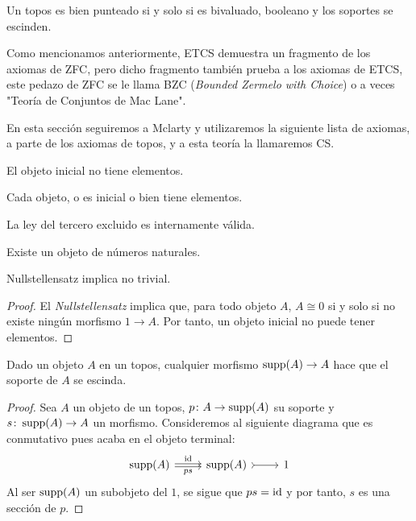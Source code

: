 \begin{theorem}
    Un topos es bien punteado si y solo si es bivaluado, booleano y los soportes se escinden.
\end{theorem}

Como mencionamos anteriormente, ETCS demuestra un fragmento de los axiomas de ZFC, pero dicho fragmento también prueba a los axiomas de ETCS,
este pedazo de ZFC se le llama BZC (\textit{Bounded Zermelo with Choice}) o a veces "Teoría de Conjuntos de Mac Lane".

En esta sección seguiremos a Mclarty \cite{mclarty1988defining} y utilizaremos la siguiente lista de axiomas,
a parte de los axiomas de topos, y a esta teoría la llamaremos CS.

\begin{axiom}[No trivial]
    El objeto inicial no tiene elementos.
\end{axiom}

\begin{axiom}
    Cada objeto, o es inicial o bien tiene elementos.
\end{axiom}

\begin{axiom}[Booleano]
    La ley del tercero excluido es internamente válida.
\end{axiom}

\begin{axiom}[Infinito]
    Existe un objeto de números naturales.
\end{axiom}

\begin{proposition}
    Nullstellensatz implica no trivial.
\end{proposition}
\begin{proof}
    El \textit{Nullstellensatz} implica que, para todo objeto $A$, $A\cong 0$ si y solo si
    no existe ningún morfismo $1\to A$. Por tanto, un objeto inicial no puede tener elementos.
\end{proof}

\begin{proposition}
    Dado un objeto $A$ en un topos, cualquier morfismo $\operatorname{supp}(A)\to A$ hace que el soporte de $A$ se escinda.
\end{proposition}
\begin{proof}
    Sea $A$ un objeto de un topos, $p\colon A\to \operatorname{supp}(A)$ su soporte y $s\colon \operatorname{supp}(A)\to A$ un morfismo. 
    Consideremos al siguiente diagrama que es conmutativo pues acaba en el objeto terminal:
    \begin{equation*}
        \begin{tikzcd}
            \supp(A)\ar[shift left = 0.3ex]{r}{\text{id}}\ar[swap, shift right = 0.3ex]{r}{ps} & \supp(A)\ar[tail]{r}{} & 1
        \end{tikzcd}
    \end{equation*}
    Al ser $\operatorname{supp}(A)$ un subobjeto del $1$, se sigue que $ps=\operatorname{id}$ y por tanto, $s$ es una sección de $p$.
\end{proof}

